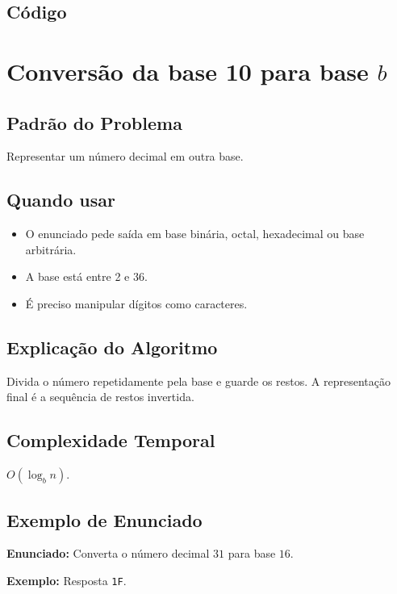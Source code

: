 \subsection{Código}

\section{Conversão da base 10 para base $b$}

\subsection{Padrão do Problema}
Representar um número decimal em outra base.

\subsection{Quando usar}
\begin{itemize}[nosep]
  \item O enunciado pede saída em base binária, octal, hexadecimal ou base arbitrária.
  \item A base está entre 2 e 36.
  \item É preciso manipular dígitos como caracteres.
\end{itemize}

\subsection{Explicação do Algoritmo}
Divida o número repetidamente pela base e guarde os restos. A representação final é a sequência de restos invertida.

\subsection{Complexidade Temporal}
$O(\log_b n)$.

\subsection{Exemplo de Enunciado}
\begin{exemplodiabox}
\textbf{Enunciado:} Converta o número decimal $31$ para base $16$.

\textbf{Exemplo:} Resposta \texttt{1F}.
\end{exemplodiabox}

